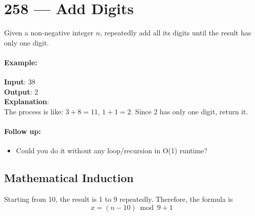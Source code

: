 \section{258 --- Add Digits}
Given a non-negative integer $n$, repeatedly add all its digits until the result has only one digit.
\paragraph{Example:}
\begin{flushleft}
\textbf{Input}: 38
\\
\textbf{Output}: 2
\\ 
\textbf{Explanation}: 
\\
The process is like: $3 + 8 = 11$, $1 + 1 = 2$. Since 2 has only one digit, return it.
\end{flushleft}
\paragraph{Follow up:}
\begin{itemize}
\item Could you do it without any loop/recursion in O(1) runtime?
\end{itemize}
\subsection{Mathematical Induction}
Starting from 10, the result is 1 to 9 repeatedly. Therefore, the formula is
\[
x=(n-10)\bmod 9 + 1
\]